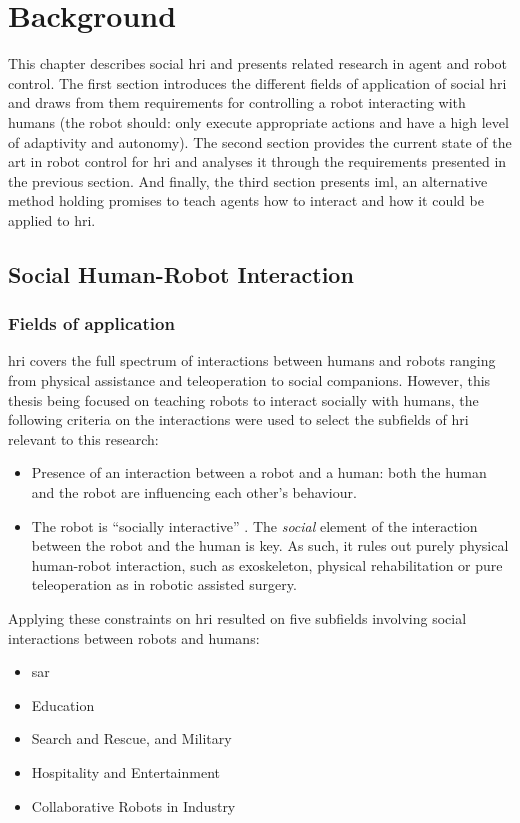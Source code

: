 \chapter{Background} \label{chap:background}
\glsresetall

This chapter describes social \gls{hri} and presents related research in agent and robot control. The first section introduces the different fields of application of social \gls{hri} and draws from them requirements for controlling a robot interacting with humans (the robot should: only execute appropriate actions and have a high level of adaptivity and autonomy). The second section provides the current state of the art in robot control for \gls{hri} and analyses it through the requirements presented in the previous section. And finally, the third section presents \gls{iml}, an alternative method holding promises to teach agents how to interact and how it could be applied to \gls{hri}.

\section{Social Human-Robot Interaction}

\subsection{Fields of application} \label{ssec:back_hri}

\gls{hri} covers the full spectrum of interactions between humans and robots ranging from physical assistance and teleoperation to social companions. However, this thesis being focused on teaching robots to interact socially with humans, the following criteria on the interactions were used to select the subfields of \gls{hri} relevant to this research:
\begin{itemize}
\item Presence of an interaction between a robot and a human: both the human and the robot are influencing each other's behaviour.
\item The robot is ``socially interactive'' \citep{Fong2003}. The \emph{social} element of the interaction between the robot and the human is  key. As such, it rules out purely physical human-robot interaction, such as exoskeleton, physical rehabilitation or pure teleoperation as in robotic assisted surgery.
\end{itemize}

Applying these constraints on \gls{hri} resulted on five subfields involving social interactions between robots and humans: 
\begin{itemize}
	\item \acrfull{sar}
	\item Education
	\item Search and Rescue, and Military
	\item Hospitality and Entertainment
	\item Collaborative Robots in Industry
\end{itemize}

